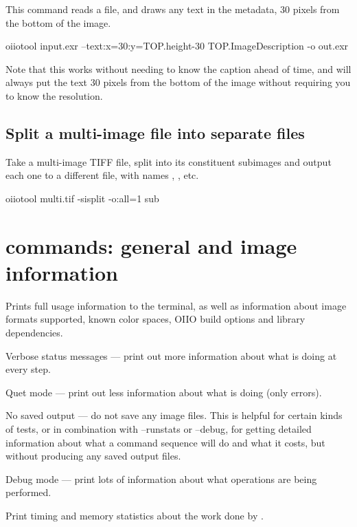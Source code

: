 \noindent This command reads a file, and draws any text in the
 metadata, 30 pixels from the bottom of the image.
\begin{code}
    oiiotool input.exr --text:x=30:y={TOP.height-30} {TOP.ImageDescription} -o out.exr
\end{code}
\noindent Note that this works without needing to know the caption ahead
of time, and will always put the text 30 pixels from the bottom of the image
without requiring you to know the resolution.


\subsection{Split a multi-image file into separate files}
\noindent Take a multi-image TIFF file, split into its constituent subimages
and output each one to a different file, with names ,
, etc.

\begin{code}
    oiiotool multi.tif -sisplit -o:all=1 sub%
\end{code}


\newpage
\section{\oiiotool commands: general and image information}

Prints full usage information to the terminal, as well as information
about image formats supported, known color spaces, OIIO build options
and library dependencies.
\apiend

Verbose status messages --- print out more information about what
\oiiotool is doing at every step.
\apiend

Quet mode --- print out less information about what \oiiotool is doing
(only errors).
\apiend

No saved output --- do not save any image files. This is helpful for certain
kinds of tests, or in combination with {\cf --runstats} or {\cf --debug},
for getting detailed information about what a command sequence will do and
what it costs, but without producing any saved output files.
\apiend

Debug mode --- print lots of information about what operations are being
performed.
\apiend

Print timing and memory statistics about the work done by \oiiotool.
\apiend

